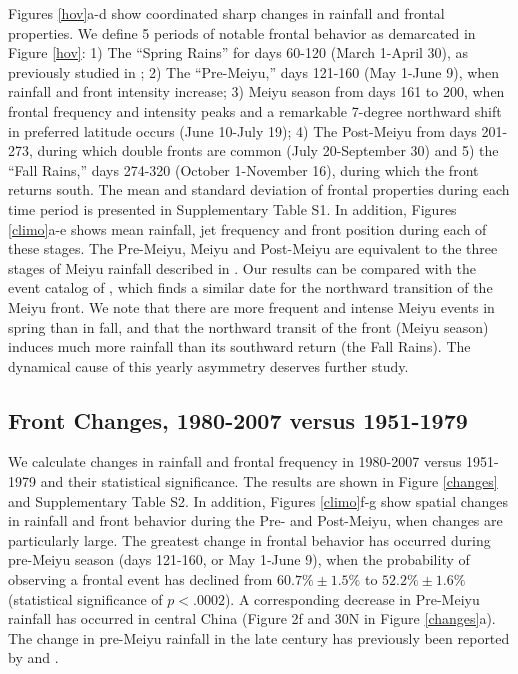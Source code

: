 \documentclass[draft,grl]{AGUTeX}
\begin{document}
\begin{article}
	Figures \ref{hov}a-d show coordinated sharp changes in rainfall and frontal properties. We define 5 periods of notable frontal behavior as demarcated in Figure \ref{hov}: 1) The ``Spring Rains'' for days 60-120 (March 1-April 30), as previously studied in \citet{Tian1998}; 2) The ``Pre-Meiyu,'' days 121-160 (May 1-June 9), when rainfall and front intensity increase; 3) Meiyu season from days 161 to 200, when frontal frequency and intensity peaks and a remarkable 7-degree northward shift in preferred latitude occurs (June 10-July 19); 4) The Post-Meiyu from days 201-273, during which double fronts are common (July 20-September 30) and 5) the ``Fall Rains,'' days 274-320 (October 1-November 16), during which the front returns south. The mean and standard deviation of frontal properties during each time period is presented in Supplementary Table S1. In addition, Figures \ref{climo}a-e shows mean rainfall, jet frequency and front position during each of these stages. The Pre-Meiyu, Meiyu and Post-Meiyu are equivalent to the three stages of Meiyu rainfall described in \citet{Ding2005}. Our results can be compared with the event catalog of \citet{Xu2009}, which finds a similar date for the northward transition of the Meiyu front. We note that there are more frequent and intense Meiyu events in spring than in fall, and that the northward transit of the front (Meiyu season) induces much more rainfall than its southward return (the Fall Rains). The dynamical cause of this yearly asymmetry deserves further study.
		
\subsection{Front Changes, 1980-2007 versus 1951-1979}
	
	We calculate changes in rainfall and frontal frequency in 1980-2007 versus 1951-1979 and their statistical significance. The results are shown in Figure \ref{changes} and Supplementary Table S2. In addition, Figures \ref{climo}f-g show spatial changes in rainfall and front behavior during the Pre- and Post-Meiyu, when changes are particularly large. The greatest change in frontal behavior has occurred during pre-Meiyu season (days 121-160, or May 1-June 9), when the probability of observing a frontal event has declined from $60.7\% \pm 1.5\%$ to $52.2\% \pm 1.6\%$ (statistical significance of $p < .0002$). A corresponding decrease in Pre-Meiyu rainfall has occurred in central China (Figure 2f and 30\textdegree N in Figure \ref{changes}a). The change in pre-Meiyu rainfall in the late  century has previously been reported by \citet{Xin2006} and \citet{Wang2009}.
		

\end{article}
\end{document}
